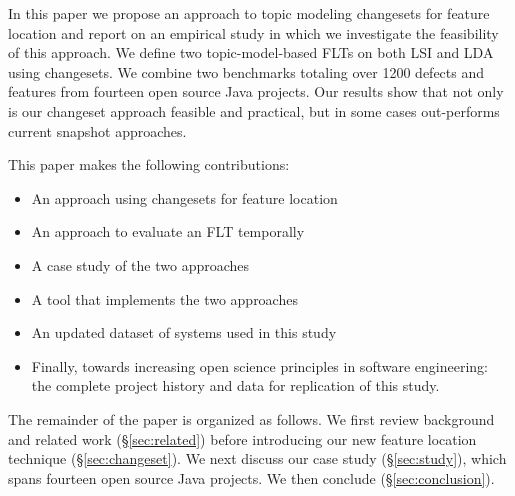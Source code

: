 In this paper we propose an approach to topic modeling changesets for feature location
and report on an empirical study in which we investigate the feasibility of this approach.
We define two topic-model-based FLTs on both LSI and LDA using changesets.
We combine two benchmarks totaling over 1200 defects and features from fourteen open source Java projects.
Our results show that not only is our changeset approach feasible and practical,
but in some cases out-performs current snapshot approaches.


This paper makes the following contributions:

\begin{itemize}
    \item An approach using changesets for feature location
    \item An approach to evaluate an FLT temporally
    \item A case study of the two approaches
    \item A tool that implements the two approaches
    \item An updated dataset of systems used in this study
    \item Finally, towards increasing open science principles in software engineering:
        the complete project history and data for replication of this study.
\end{itemize}

The remainder of the paper is organized as follows.
We first review background and related work (\S\ref{sec:related})
before introducing our new feature location technique (\S\ref{sec:changeset}).
We next discuss our case study (\S\ref{sec:study}), which spans fourteen open source Java projects. %
We then conclude (\S\ref{sec:conclusion}).

